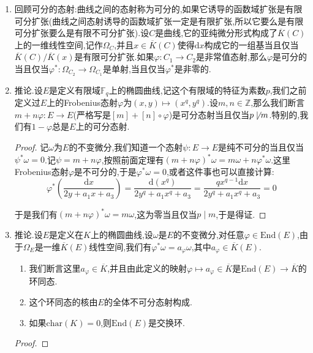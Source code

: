 \begin{enumerate}
\begin{proof}
		设$\omega$是$E$上的不变微分,按照$K$中有$m\not=0$,于是$[m]^*\omega=m\omega\not=0$.于是$[m]$不是常值映射.
	\end{proof}
	\item 回顾可分的态射:曲线之间的态射称为可分的,如果它诱导的函数域扩张是有限可分扩张(曲线之间态射诱导的函数域扩张一定是有限扩张,所以它要么是有限可分扩张要么是有限不可分扩张).设$C$是曲线,它的亚纯微分形式构成了$\overline{K}(C)$上的一维线性空间,记作$\Omega_C$,并且$x\in\overline{K}(C)$使得$\mathrm{d}x$构成它的一组基当且仅当$\overline{K}(C)/\overline{K}(x)$是有限可分扩张.如果$\varphi:C_1\to C_2$是非常值态射,那么$\varphi$是可分的当且仅当$\varphi^*:\Omega_{C_2}\to\Omega_{C_1}$是单射,当且仅当$\varphi^*$是非零的.
	\item 推论.设$E$是定义有限域$\mathbb{F}_q$上的椭圆曲线,记这个有限域的特征为素数$p$,我们之前定义过$E$上的Frobenius态射$\varphi$为$(x,y)\mapsto(x^q,y^q)$.设$m,n\in\mathbb{Z}$,那么我们断言$m+n\varphi:E\to E$(严格写是$[m]+[n]\circ\varphi$)是可分态射当且仅当$p\not\mid m$.特别的,我们有$1-\varphi$总是$E$上的可分态射.
	\begin{proof}
		
		记$\omega$为$E$的不变微分,我们知道一个态射$\psi:E\to E$是纯不可分的当且仅当$\psi^*\omega=0$.记$\psi=m+n\varphi$,按照前面定理有$(m+n\varphi)^*\omega=m\omega+n\varphi^*\omega$.这里Frobenius态射$\varphi$是不可分的,于是$\varphi^*\omega=0$,或者这件事也可以直接计算:
		$$\varphi^*\left(\frac{\mathrm{d}x}{2y+a_1x+a_3}\right)=\frac{\mathrm{d}(x^q)}{2y^q+a_1x^q+a_3}=\frac{qx^{q-1}\mathrm{d}x}{2y^q+a_1x^q+a_3}=0$$
		
		于是我们有$(m+n\varphi)^*\omega=m\omega$,这为零当且仅当$p\mid m$,于是得证.
	\end{proof}
	\item 推论.设$E$是定义在$K$上的椭圆曲线,设$\omega$是$E$的不变微分,对任意$\varphi\in\mathrm{End}(E)$,由于$\Omega_E$是一维$\overline{K}(E)$线性空间,我们有$\varphi^*\omega=a_{\varphi}\omega$,其中$a_{\varphi}\in\overline{K}(E)$.
	\begin{enumerate}
		\item 我们断言这里$a_{\varphi}\in\overline{K}$,并且由此定义的映射$\varphi\mapsto a_{\varphi}\in\overline{K}$是$\mathrm{End}(E)\to\overline{K}$的环同态.
		\item 这个环同态的核由$E$的全体不可分态射构成.
		\item 如果$\mathrm{char}(K)=0$,则$\mathrm{End}(E)$是交换环.
	\end{enumerate}
	\begin{proof}
		

\end{proof}
\end{enumerate}
